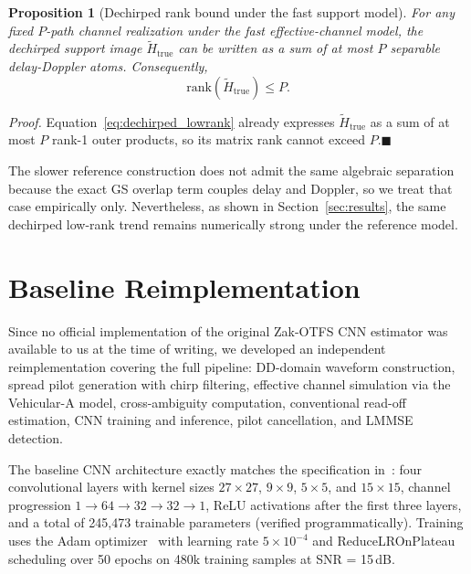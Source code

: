 \documentclass[conference]{IEEEtran}
\newtheorem{proposition}{Proposition}
\begin{document}
\begin{proposition}[Dechirped rank bound under the fast support model]
\label{prop:fast_rank}
For any fixed $P$-path channel realization under the fast effective-channel model, the dechirped support image $\widetilde{H}_{\mathrm{true}}$ can be written as a sum of at most $P$ separable delay-Doppler atoms. Consequently,
\begin{equation}
\mathrm{rank}\!\left(\widetilde{H}_{\mathrm{true}}\right) \le P.
\end{equation}
\end{proposition}
\noindent\textit{Proof.} Equation~\eqref{eq:dechirped_lowrank} already expresses $\widetilde{H}_{\mathrm{true}}$ as a sum of at most $P$ rank-1 outer products, so its matrix rank cannot exceed $P$.\hfill$\blacksquare$

The slower reference construction does not admit the same algebraic separation because the exact GS overlap term couples delay and Doppler, so we treat that case empirically only. Nevertheless, as shown in Section~\ref{sec:results}, the same dechirped low-rank trend remains numerically strong under the reference model.

\section{Baseline Reimplementation}
\label{sec:baseline}

Since no official implementation of the original Zak-OTFS CNN estimator was available to us at the time of writing, we developed an independent reimplementation covering the full pipeline: DD-domain waveform construction, spread pilot generation with chirp filtering, effective channel simulation via the Vehicular-A model, cross-ambiguity computation, conventional read-off estimation, CNN training and inference, pilot cancellation, and LMMSE detection.

The baseline CNN architecture exactly matches the specification in~\cite{zakotfs2024}:
four convolutional layers with kernel sizes $27 \times 27$, $9 \times 9$, $5 \times 5$, and $15 \times 15$, channel progression $1 \to 64 \to 32 \to 32 \to 1$, ReLU activations after the first three layers, and a total of 245,473 trainable parameters (verified programmatically). Training uses the Adam optimizer~\cite{kingma2014adam} with learning rate $5 \times 10^{-4}$ and ReduceLROnPlateau scheduling over 50 epochs on 480k training samples at SNR = 15\,dB.
\end{document}
